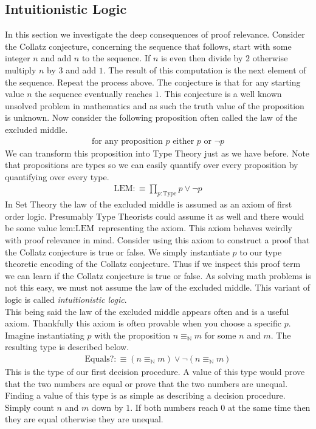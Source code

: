 \documentclass[./Thesis.tex]{subfiles}
\begin{document}
\subsection{Intuitionistic Logic}
In this section we investigate the deep consequences of proof relevance.
Consider the Collatz conjecture, concerning the sequence that follows, start with some
integer $n$ and add $n$ to the sequence. If $n$ is even then divide by $2$
otherwise multiply $n$ by $3$ and add $1$. The result of this computation is the
next element of the sequence. Repeat the process above. The conjecture is
that for any starting value $n$ the sequence eventually reaches $1$. This
conjecture is a well known unsolved problem in mathematics and as such the truth
value of the proposition is unknown. Now consider the following proposition
often called the law of the excluded middle.
\begin{align}
  \label{eqn:set-LEM}
  \text{for any proposition } p \text{ either } p \text{ or } \neg p
\end{align}
We can transform this proposition into Type Theory just as we have before. Note
that propositions are types so we can easily quantify over every proposition by
quantifying over every type.
\begin{align}
  \label{eqn:type-LEM}
  \text{LEM} :\equiv \prod_{p  : \text{Type}} p \vee \neg p
\end{align}
In Set Theory the law of the excluded middle is assumed as an axiom of first
order logic. Presumably Type Theorists could assume it as well and there would
be some value $\text{lem} : \text{LEM}$ representing the axiom. This axiom behaves weirdly
with proof relevance in mind. Consider using this axiom to construct a proof
that the Collatz conjecture is true or false. We simply instantiate $p$ to our
type theoretic encoding of the Collatz conjecture. Thus if we inspect this proof
term we can learn if the Collatz conjecture is true or false. As solving math
problems is not this easy, we must not assume the law of the excluded middle.
This variant of logic is called \textit{intuitionistic logic}. \\

This being said the law of the excluded middle appears often
and is a useful axiom. Thankfully this axiom is often provable when you choose a
specific $p$. Imagine instantiating $p$ with the proposition
$n \equiv_{\mathbb{N}} m$ for some $n$ and $m$.
The resulting type is described below.
\begin{align}
  \label{eqn:nat-dec}
  \text{Equals?} :\equiv (n \equiv_{\mathbb{N}} m) \vee \neg (n \equiv_{\mathbb{N}} m)
\end{align}
This is the type of our first decision procedure. A value of this type would
prove that the two numbers are equal or prove that the two numbers are unequal.
Finding a value of this type is as simple as describing a decision procedure.
Simply count $n$ and $m$ down by $1$. If both numbers reach $0$ at the same time
then they are equal otherwise they are unequal. \\
\end{document}
